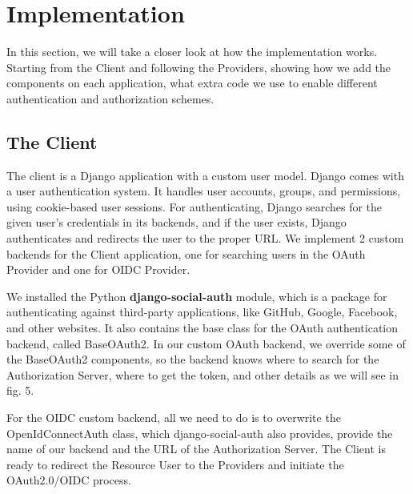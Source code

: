\section{Implementation}

In this section, we will take a closer look at how the implementation works. Starting from the Client and following the Providers, showing how we add the components on each application, what extra code we use to enable different authentication and authorization schemes. 


\subsection{The Client}

The client is a Django application with a custom user model. Django comes with a user authentication system. It handles user accounts, groups, and permissions, using cookie-based user sessions. For authenticating, Django searches for the given user's credentials in its backends, and if the user exists, Django authenticates and redirects the user to the proper URL. We implement 2 custom backends for the Client application, one for searching users in the OAuth Provider and one for OIDC Provider.

We installed the Python \textbf{django-social-auth} \cite{djangosocial} module, which is a package for authenticating against third-party applications, like GitHub, Google, Facebook, and other websites. It also contains the base class for the OAuth authentication backend, called BaseOAuth2. In our custom OAuth backend, we override some of the BaseOAuth2 components, so the backend knows where to search for the Authorization Server, where to get the token, and other details as we will see in fig. 5.

For the OIDC custom backend, all we need to do is to overwrite the OpenIdConnectAuth class, which django-social-auth also provides, provide the name of our backend and the URL of the Authorization Server. The Client is ready to redirect the Resource User to the Providers and initiate the OAuth2.0/OIDC process.


